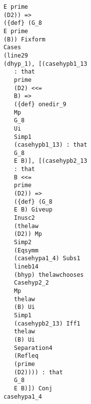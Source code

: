 \documentclass[12pt]{article}
\begin{document}
\begin{verbatim}
                                        E prime 
                                        (D2)) => 
                                        ({def} (G_8 
                                        E prime 
                                        (B)) Fixform 
                                        Cases 
                                        (line29 
                                        (dhyp_1), [(casehypb1_13 
                                           : that 
                                           prime 
                                           (D2) <<= 
                                           B) => 
                                           ({def} onedir_9 
                                           Mp 
                                           G_8 
                                           Ui 
                                           Simp1 
                                           (casehypb1_13) : that 
                                           G_8 
                                           E B)], [(casehypb2_13 
                                           : that 
                                           B <<= 
                                           prime 
                                           (D2)) => 
                                           ({def} (G_8 
                                           E B) Giveup 
                                           Inusc2 
                                           (thelaw 
                                           (D2)) Mp 
                                           Simp2 
                                           (Eqsymm 
                                           (casehypa1_4) Subs1 
                                           lineb14 
                                           (bhyp) thelawchooses 
                                           Casehyp2_2 
                                           Mp 
                                           thelaw 
                                           (B) Ui 
                                           Simp1 
                                           (casehypb2_13) Iff1 
                                           thelaw 
                                           (B) Ui 
                                           Separation4 
                                           (Refleq 
                                           (prime 
                                           (D2)))) : that 
                                           G_8 
                                           E B)]) Conj 
                                        casehypa1_4 

\end{verbatim}
\end{document}
